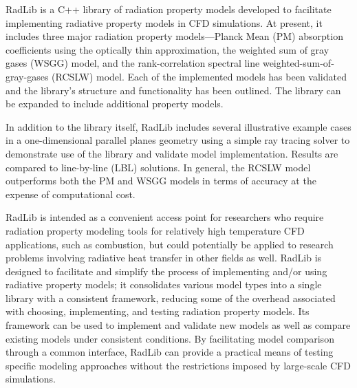 \documentclass[preprint,12pt]{elsarticle}
\begin{document}
RadLib is a C++ library of radiation property models developed to facilitate implementing radiative property models in CFD simulations. At present, it includes three major radiation property models---Planck Mean (PM) absorption coefficients using the optically thin approximation, the weighted sum of gray gases (WSGG) model, and the rank-correlation spectral line weighted-sum-of-gray-gases (RCSLW) model. Each of the implemented models has been validated and the library's structure and functionality has been outlined. The library can be expanded to include additional property models.

In addition to the library itself, RadLib includes several illustrative example cases in a one-dimensional parallel planes geometry using a simple ray tracing solver to demonstrate use of the library and validate model implementation. Results are compared to line-by-line (LBL) solutions. In general, the RCSLW model outperforms both the PM and WSGG models in terms of accuracy at the expense of computational cost. %

RadLib is intended as a convenient access point for researchers who require radiation property modeling tools for relatively high temperature CFD applications, such as combustion, but could potentially be applied to research problems involving radiative heat transfer in other fields as well. RadLib is designed to facilitate and simplify the process of implementing and/or using radiative property models; it consolidates various model types into a single library with a consistent framework, reducing some of the overhead associated with choosing, implementing, and testing radiation property models. Its framework can be used to implement and validate new models as well as compare existing models under consistent conditions. By facilitating model comparison through a common interface, RadLib can provide a practical means of testing specific modeling approaches without the restrictions imposed by large-scale CFD simulations. %
\end{document}
